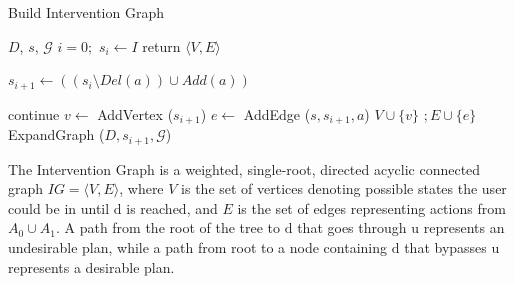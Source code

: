 \documentclass[doctor]{thesis} %
\theoremstyle{plain}
\begin{document}
\begin{algorithm}[tb]
        \caption{Build Intervention Graph}
        \label{bsg}
        \begin{algorithmic}[1]
                \Require $D$, $s$, $\mathcal{G}$
                \State $i=0;$ $ s_{i} \gets I $
                 return $\langle V,E\rangle$
                \Else
                                \State \parbox[t]{0.95\linewidth} 
                                {$s_{i+1} \gets ((s_{i} \setminus Del(a))\cup Add(a))$}
                                 continue \EndIf
                                \State $v \gets$ AddVertex ($s_{i+1}$)
                                \State $e \gets$ AddEdge ($s, s_{i+1}, a$)
                                \State $V \cup \{v\}$ $; E \cup \{e\}$
                                \State ExpandGraph ($D, s_{i+1}, \mathcal{G}$)
                        \EndFor
                \EndIf  
                \EndProcedure
        \end{algorithmic}
\end{algorithm}

The Intervention Graph is a weighted, single-root, directed acyclic connected graph $IG= \langle V,E \rangle$, where $V$ is the set of vertices denoting possible states the user could be in until $\mathrm{d}$ is reached, and $E$ is the set of edges representing actions from $A_0 \cup A_{1}$. A path from the root of the tree to $\mathrm{d}$ that goes through $\mathrm{u}$ represents an undesirable plan, while a path from root to a node containing $\mathrm{d}$ that bypasses $\mathrm{u}$ represents a desirable plan.
 

\end{document}
